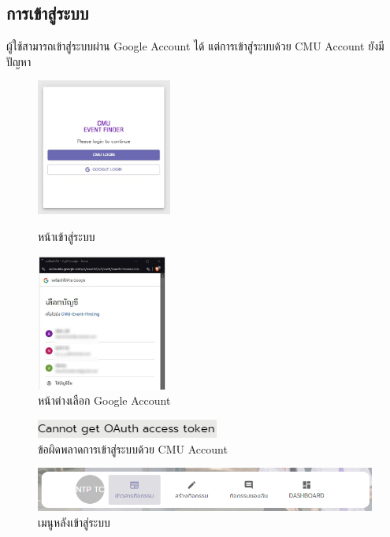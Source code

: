 \subsection{การเข้าสู่ระบบ}
ผู้ใช้สามารถเข้าสู่ระบบผ่าน Google Account ได้ แต่การเข้าสู่ระบบด้วย CMU Account ยังมีปัญหา
\begin{figure}[htb]
    \begin{minipage}[b]{0.48\textwidth}
        \includegraphics[width=\textwidth, height=4.5cm]{public/login-page.jpg}
        \caption[ผลทดลองหน้าเข้าสู่ระบบ]{หน้าเข้าสู่ระบบ}
    \end{minipage}
    \hfill
    \begin{minipage}[b]{0.48\textwidth}
        \includegraphics[width=\textwidth, height=4.5cm]{public/login-prompt.jpg}
        \caption[ผลทดลองหน้าต่างเลือก Google Account]{หน้าต่างเลือก Google Account}
    \end{minipage}
\end{figure}
\begin{figure}[H]
    \begin{center}
    \includegraphics[scale=1]{public/cmu-bug.png}
    \end{center}
    \caption[ผลทดลองข้อผิดพลาดการเข้าสู่ระบบด้วย CMU Account]{ข้อผิดพลาดการเข้าสู่ระบบด้วย CMU Account}
    \label{fig:cmu-bug}
\end{figure}
\begin{figure}[H]
    \begin{center}
    \includegraphics[scale=0.7]{public/after-login-nav.png}
    \end{center}
    \caption[ผลทดลองเมนูหลังเข้าสู่ระบบ]{เมนูหลังเข้าสู่ระบบ}
    \label{fig:after-login-nav}
\end{figure}
\clearpage
